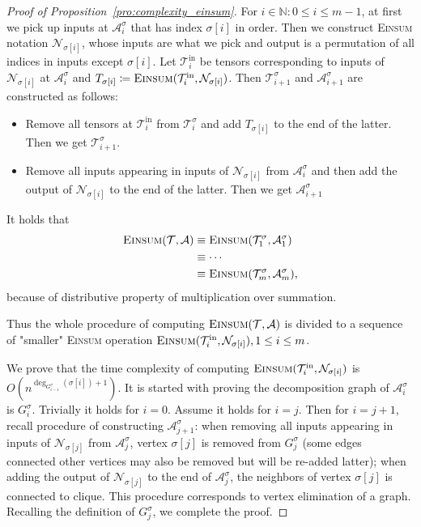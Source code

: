 \documentclass[twoside,11pt]{article}
\def\Einsum{\textsc{Einsum}}
\newcommand{\tensorcontraction}{\textsc{Einsum}}
\newcommand{\degp}[2]{\deg_{#2}(#1)}
\newcommand{\less}{O}
\def\calN{\mathcal{N}}
\def\calA{\mathcal{A}}
\def\calT{\mathcal{T}}
\newcommand{\naturals}{\mathbb{N}}
\begin{document}
\begin{proof}[Proof of Proposition~\ref{pro:complexity_einsum}]
For $i \in \naturals: 0 \leq i \leq m-1$, at first we pick up inputs at $\calA^\sigma_i$ that has index $\sigma[i]$ in order. Then we construct \Einsum{} notation $\calN_{\sigma[i]}$, whose inputs are what we pick and output is a permutation of all indices in inputs except $\sigma[i]$. Let $\calT_i^{\mathrm{in}}$ be tensors corresponding to inputs of $\calN_{\sigma[i]}$ at $\calA^\sigma_i$ and $T_{\sigma[i]} \coloneqq \tensorcontraction(\calT_i^{\mathrm{in}}, \calN_{\sigma[i]})$. Then $\calT^\sigma_{i+1}$ and  $\calA^\sigma_{i+1}$ are constructed as follows:
\begin{itemize}
    \item Remove all tensors at $\calT_i^{\mathrm{in}}$ from $\calT^\sigma_i$ and add $T_{\sigma[i]}$ to the end of the latter. Then we get $\calT^\sigma_{i+1}$. 
    \item Remove all inputs appearing in inputs of $\calN_{\sigma[i]}$ from $\calA^\sigma_i$ and then add the output of $\calN_{\sigma[i]}$ to the end of the latter. Then we get $\calA^\sigma_{i+1}$
\end{itemize}

It holds that
\begin{align*}
    \tensorcontraction(\calT, \calA) & \equiv \tensorcontraction(\calT^\sigma_1, \calA^\sigma_1) \\
    & \equiv \cdots \\
    & \equiv \tensorcontraction(\calT^\sigma_m, \calA^\sigma_m),
\end{align*}
because of distributive property of multiplication over summation. 

Thus the whole procedure of computing $\tensorcontraction(\calT, \calA)$ is divided to a sequence of "smaller" \Einsum{} operation $\tensorcontraction(\calT_i^{\mathrm{in}}, \calN_{\sigma[i]}), 1 \leq i \leq m$. 

We prove that the time complexity of computing $\tensorcontraction(\calT_i^{\mathrm{in}},\calN_{\sigma[i]})$ is $\less(n^{\degp{\sigma[i]}{G^\sigma_{i-1}}+1})$. 
It is started with proving the decomposition graph of $\calA^\sigma_i$ is $G^\sigma_i$. Trivially it holds for $i=0$. Assume it holds for $i = j$. Then for $i=j+1$, recall procedure of constructing $\calA^\sigma_{j+1}$: when removing all inputs appearing in inputs of $\calN_{\sigma[j]}$ from $\calA^\sigma_j$, vertex $\sigma[j]$ is removed from $G^\sigma_j$ (some edges connected other vertices may also be removed but will be re-added latter); when adding the output of $\calN_{\sigma[j]}$ to the end of $\calA^\sigma_j$, the neighbors of vertex $\sigma[j]$ is connected to clique. This procedure corresponds to vertex elimination of a graph. Recalling the definition of $G^\sigma_j$, we complete the proof. 


\end{proof}
\end{document}
